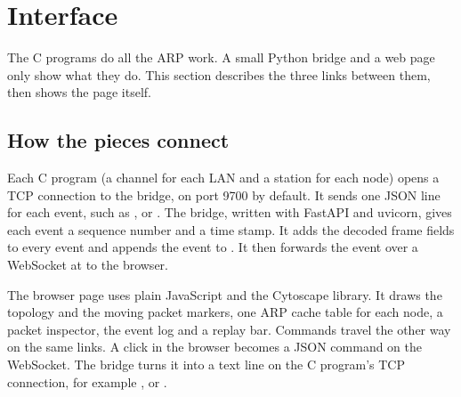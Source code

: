 \section{Interface}\label{sec:interface}
The C programs do all the ARP work. A small Python bridge and a web page only show what they do. This section describes the three links between them, then shows the page itself.

\subsection{How the pieces connect}
Each C program (a channel for each LAN and a station for each node) opens a TCP connection to the bridge, on port 9700 by default. It sends one JSON line for each event, such as ,  or . The bridge, written with FastAPI and uvicorn, gives each event a sequence number and a time stamp. It adds the decoded frame fields to every  event and appends the event to . It then forwards the event over a WebSocket at  to the browser.

The browser page uses plain JavaScript and the Cytoscape library. It draws the topology and the moving packet markers, one ARP cache table for each node, a packet inspector, the event log and a replay bar. Commands travel the other way on the same links. A click in the browser becomes a JSON command on the WebSocket. The bridge turns it into a text line on the C program's TCP connection, for example ,  or .

